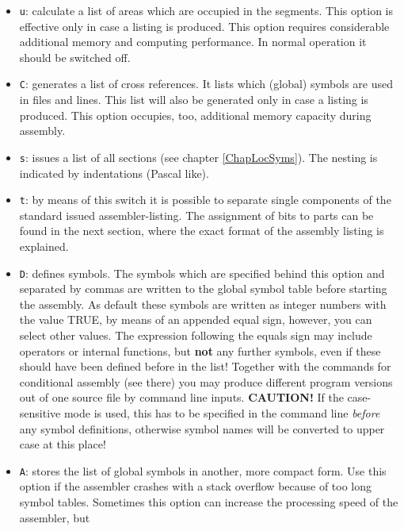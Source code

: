\documentclass[12pt,twoside]{report}
\newcommand{\bb}[1]{{\bf #1}}
\newcommand{\tty}[1]{{\tt #1}}
\begin{document}
\begin{itemize}
{      files, in case it didn't find a file in the
      current directory.  The different directories
      have to be separated by semicolons.}
\item{\tty{u}: calculate a list of areas which are occupied in the segments. 
      This option is effective only in case a listing is 
      produced. This option requires considerable additional 
      memory and computing performance. In normal operation it 
      should be switched off.}
\item{\tty{C}: generates a list of cross references.  It lists which (global)
      symbols are used in files and lines.  This list will also be
      generated only in case a listing is produced.  This option
      occupies, too, additional memory capacity during assembly.}
\item{\tty{s}: issues a list of all sections (see chapter
      \ref{ChapLocSyms}).  The nesting is indicated  by indentations
      (Pascal like).}
\item{\tty{t}: by means of this switch it is possible to separate single 
      components of the standard issued assembler-listing.  The assignment
      of bits to parts can be found in the next section, where the exact
      format of the assembly listing is explained.}
\item{\tty{D}: defines symbols.  The symbols which are specified behind this 
      option and separated by commas are written to the 
      global symbol table before starting the assembly.  As default 
      these symbols are written as integer numbers with the 
      value TRUE, by means of an appended equal sign, however, you
      can select other values.  The expression following the equals
      sign may include operators or internal functions, but \bb{not}
      any further symbols, even if these should have been defined
      before in the list!  Together with the commands for
      conditional assembly (see there) you may produce different
      program versions out of one source file by command line
      inputs. {\bf CAUTION!} If the case-sensitive mode is used, this has
      to be specified in the command line {\em before} any symbol
      definitions, otherwise symbol names will be converted to upper
      case at this place!}
\item{\tty{A}: stores the list of global symbols in another, more compact 
      form.  Use this option if the assembler crashes with a stack 
      overflow because of too long symbol tables.  Sometimes this
      option can increase the processing speed of the assembler, but
}
\end{itemize}
\end{document}
